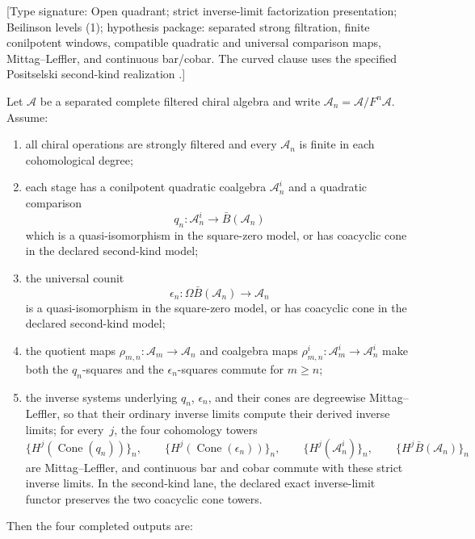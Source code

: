 \begin{theorem}\label{thm:completed-koszul-dual}
\textup{[Type signature: Open quadrant; strict inverse-limit
factorization presentation; Beilinson levels (1);
hypothesis package: separated strong filtration, finite conilpotent
windows, compatible quadratic and universal comparison maps,
Mittag--Leffler, and continuous bar/cobar.  The curved clause uses the
specified Positselski second-kind realization \cite{Positselski11}.]}

Let $\mathcal A$ be a separated complete filtered chiral algebra and
write $\mathcal A_n=\mathcal A/F^n\mathcal A$.  Assume:
\begin{enumerate}[label=\textup{(C\arabic*)}]
\item all chiral operations are strongly filtered and every
 $\mathcal A_n$ is finite in each cohomological degree;
\item each stage has a conilpotent quadratic coalgebra
 $\mathcal A_n^i$ and a quadratic comparison
 \[
  q_n\colon\mathcal A_n^i\longrightarrow\bar B(\mathcal A_n)
 \]
 which is a quasi-isomorphism in the square-zero model, or has
 coacyclic cone in the declared second-kind model;
\item the universal counit
 \[
  \epsilon_n\colon\Omega\bar B(\mathcal A_n)\longrightarrow\mathcal A_n
 \]
 is a quasi-isomorphism in the square-zero model, or has coacyclic cone
 in the declared second-kind model;
\item the quotient maps $\rho_{m,n}\colon\mathcal A_m\to\mathcal A_n$
 and coalgebra maps
 $\rho^i_{m,n}\colon\mathcal A_m^i\to\mathcal A_n^i$ make both the
 $q_n$-squares and the $\epsilon_n$-squares commute for $m\ge n$;
\item the inverse systems underlying $q_n$, $\epsilon_n$, and their
 cones are degreewise Mittag--Leffler, so that their ordinary inverse
 limits compute their derived inverse limits; for every~$j$, the four
 cohomology towers
 \[
 \{H^j(\operatorname{Cone}(q_n))\}_n,
 \qquad
 \{H^j(\operatorname{Cone}(\epsilon_n))\}_n,
 \qquad
 \{H^j(\mathcal A_n^i)\}_n,
 \qquad
 \{H^j\bar B(\mathcal A_n)\}_n
 \]
 are Mittag--Leffler, and continuous bar and cobar commute with these
 strict inverse limits.  In the second-kind lane, the declared exact
 inverse-limit functor preserves the two coacyclic cone towers.
\end{enumerate}
Then the four completed outputs are:
\begin{enumerate}[label=\textup{(\roman*)}]

\end{enumerate}
\end{theorem}
